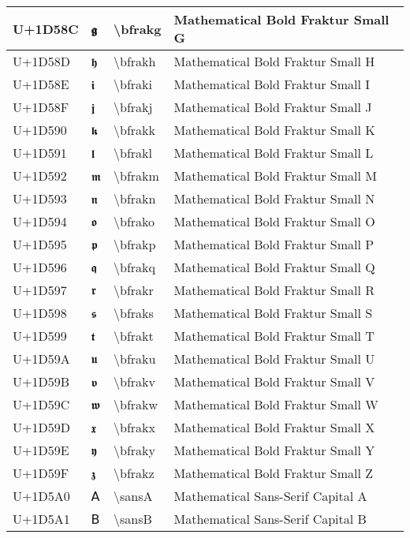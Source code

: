 \begin{table}[h]
\begin{tabulary}{\linewidth}{|L|L|L|L|}
\hline
U+1D58C & 𝖌 & {\textbackslash}bfrakg & Mathematical Bold Fraktur Small G \\
\hline
U+1D58D & 𝖍 & {\textbackslash}bfrakh & Mathematical Bold Fraktur Small H \\
\hline
U+1D58E & 𝖎 & {\textbackslash}bfraki & Mathematical Bold Fraktur Small I \\
\hline
U+1D58F & 𝖏 & {\textbackslash}bfrakj & Mathematical Bold Fraktur Small J \\
\hline
U+1D590 & 𝖐 & {\textbackslash}bfrakk & Mathematical Bold Fraktur Small K \\
\hline
U+1D591 & 𝖑 & {\textbackslash}bfrakl & Mathematical Bold Fraktur Small L \\
\hline
U+1D592 & 𝖒 & {\textbackslash}bfrakm & Mathematical Bold Fraktur Small M \\
\hline
U+1D593 & 𝖓 & {\textbackslash}bfrakn & Mathematical Bold Fraktur Small N \\
\hline
U+1D594 & 𝖔 & {\textbackslash}bfrako & Mathematical Bold Fraktur Small O \\
\hline
U+1D595 & 𝖕 & {\textbackslash}bfrakp & Mathematical Bold Fraktur Small P \\
\hline
U+1D596 & 𝖖 & {\textbackslash}bfrakq & Mathematical Bold Fraktur Small Q \\
\hline
U+1D597 & 𝖗 & {\textbackslash}bfrakr & Mathematical Bold Fraktur Small R \\
\hline
U+1D598 & 𝖘 & {\textbackslash}bfraks & Mathematical Bold Fraktur Small S \\
\hline
U+1D599 & 𝖙 & {\textbackslash}bfrakt & Mathematical Bold Fraktur Small T \\
\hline
U+1D59A & 𝖚 & {\textbackslash}bfraku & Mathematical Bold Fraktur Small U \\
\hline
U+1D59B & 𝖛 & {\textbackslash}bfrakv & Mathematical Bold Fraktur Small V \\
\hline
U+1D59C & 𝖜 & {\textbackslash}bfrakw & Mathematical Bold Fraktur Small W \\
\hline
U+1D59D & 𝖝 & {\textbackslash}bfrakx & Mathematical Bold Fraktur Small X \\
\hline
U+1D59E & 𝖞 & {\textbackslash}bfraky & Mathematical Bold Fraktur Small Y \\
\hline
U+1D59F & 𝖟 & {\textbackslash}bfrakz & Mathematical Bold Fraktur Small Z \\
\hline
U+1D5A0 & 𝖠 & {\textbackslash}sansA & Mathematical Sans-Serif Capital A \\
\hline
U+1D5A1 & 𝖡 & {\textbackslash}sansB & Mathematical Sans-Serif Capital B \\

\end{tabulary}
\end{table}

